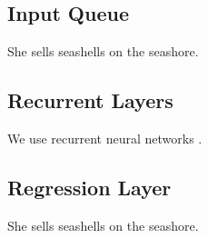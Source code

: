 \subsection{Input Queue}
She sells seashells on the seashore.

\subsection{Recurrent Layers}
We use recurrent neural networks \cite{goodfellow2016}.

\subsection{Regression Layer}
She sells seashells on the seashore.
